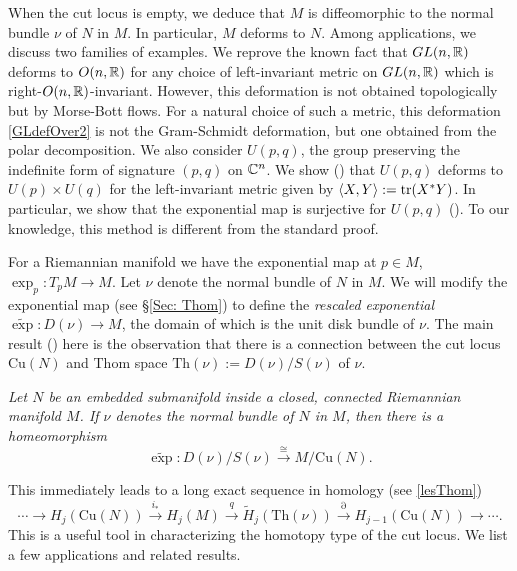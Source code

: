 \vspace{0.2cm}
\noindent When the cut locus is empty, we deduce that $M$ is diffeomorphic to the normal bundle $\nu$ of $N$ in $M$. In particular, $M$ deforms to $N$. Among applications, we discuss two families of examples. We reprove the known fact that $GL(n,\mathbb{R})$ deforms to $O(n,\mathbb{R})$ for any choice of left-invariant metric on $GL(n,\mathbb{R})$ which is right-$O(n,\mathbb{R})$-invariant. However, this deformation is not obtained topologically but by Morse-Bott flows. For a natural choice of such a metric, this deformation \eqref{GLdefOver2} is not the Gram-Schmidt deformation, but one obtained from the polar decomposition. We also consider $U(p,q)$, the group preserving the indefinite form of signature $(p,q)$ on $\mathbb{C}^n$. We show () that $U(p,q)$ deforms to $U(p)\times U(q)$ for the left-invariant metric given by $\left\langle X,Y\right\rangle:=\textup{tr}(X^\ast Y)$. In particular, we show that the exponential map is surjective for $U(p,q)$ (). To our knowledge, this method is different from the standard proof.

\vspace{0.3cm}
\hf For a Riemannian manifold we have the exponential map at $p\in M$, $\exp_p:T_pM\to M$. Let $\nu$ denote the normal bundle of $N$ in $M$. We will modify the exponential map (see \S \ref{Sec: Thom}) to define the \emph{rescaled exponential} $\widetilde{\exp}:D(\nu)\to M$, the domain of which is the unit disk bundle of $\nu$. The main result () here is the observation that there is a connection between the cut locus $\mathrm{Cu}(N)$ and Thom space $\mathrm{Th}(\nu):=D(\nu)/S(\nu)$ of $\nu$. 


\begin{mainthm}\label{thm:ThmC}
    \textit{ Let $N$ be an embedded submanifold inside a closed, connected Riemannian manifold $M$. If $\nu$ denotes the normal bundle of $N$ in $M$, then there is a homeomorphism
    \begin{displaymath}
        \widetilde{\exp}:D(\nu)/S(\nu) \xrightarrow{\cong}M/\mathrm{Cu}(N).
    \end{displaymath}}
\end{mainthm}

\vspace{0.3cm}
\noindent This immediately leads to a long exact sequence in homology (see \eqref{lesThom})
\begin{displaymath}
	\cdots\to  H_j(\mathrm{Cu}(N)) \stackrel{i_*}{\longrightarrow}H_j(M)\stackrel{q}{\longrightarrow} \widetilde{H}_j(\mathrm{Th}(\nu))\stackrel{\partial}{\longrightarrow} H_{j-1}(\mathrm{Cu}(N))\to \cdots.
\end{displaymath}
This is a useful tool in characterizing the homotopy type of the cut locus. We list a few applications and related results.

